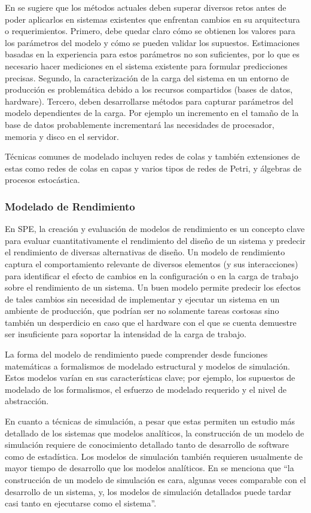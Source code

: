 En \cite{Jin:2007:PEP:1248820.1248885} se sugiere que los métodos actuales deben superar diversos retos antes de poder aplicarlos en sistemas existentes que enfrentan cambios en su arquitectura o requerimientos. Primero, debe quedar claro cómo se obtienen los valores para los parámetros del modelo y cómo se pueden validar los supuestos. Estimaciones basadas en la experiencia para estos parámetros no son suficientes, por lo que es necesario hacer mediciones en el sistema existente para formular predicciones precisas. Segundo, la caracterización de la carga del sistema en un entorno de producción es problemática debido a los recursos compartidos (bases de datos, hardware). Tercero, deben desarrollarse métodos para capturar parámetros del modelo dependientes de la carga. Por ejemplo un incremento en el tamaño de la base de datos probablemente incrementará las necesidades de procesador, memoria y disco en el servidor.

Técnicas comunes de modelado incluyen redes de colas y también extensiones de estas como redes de colas en capas y varios tipos de redes de Petri, y álgebras de procesos estocástica.

\subsubsection{Modelado de Rendimiento}
En SPE, la creación y evaluación de modelos de rendimiento es un concepto clave para evaluar cuantitativamente el rendimiento del diseño de un sistema y predecir el rendimiento de diversas alternativas de diseño. Un modelo de rendimiento captura el comportamiento relevante de diversos elementos (y sus interacciones) para identificar el efecto de cambios en la configuración o en la carga de trabajo sobre el rendimiento de un sistema. Un buen modelo permite predecir los efectos de tales cambios sin necesidad de implementar y ejecutar un sistema en un ambiente de producción, que podrían ser no solamente tareas costosas sino también un desperdicio en caso que el hardware con el que se cuenta demuestre ser insuficiente para soportar la intensidad de la carga de trabajo.\cite{Noorshams2015_1000046750}

La forma del modelo de rendimiento puede comprender desde funciones matemáticas a formalismos de modelado estructural y modelos de simulación. Estos modelos varían en sus características clave; por ejemplo, los supuestos de modelado de los formalismos, el esfuerzo de modelado requerido y el nivel de abstracción.

En cuanto a técnicas de simulación, a pesar que estas permiten un estudio más detallado de los sistemas que modelos analíticos, la construcción de un modelo de simulación requiere de conocimiento detallado tanto de desarrollo de software como de estadística\cite{Gooijer2011PerformanceMO}. Los modelos de simulación también requieren usualmente de mayor tiempo de desarrollo que los modelos analíticos. En \cite{4221619} se menciona que ``la construcción de un modelo de simulación es cara, algunas veces comparable con el desarrollo de un sistema, y, los modelos de simulación detallados puede tardar casi tanto en ejecutarse como el sistema''.

